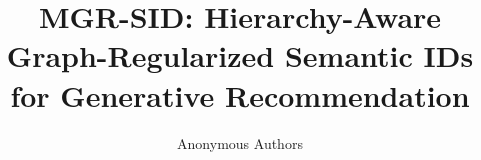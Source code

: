 \documentclass{article}
\title{MGR-SID: Hierarchy-Aware Graph-Regularized Semantic IDs for Generative Recommendation}
\author{Anonymous Authors}
\begin{document}
\maketitle

\begin{abstract}

\end{abstract}











\appendix

\end{document}
